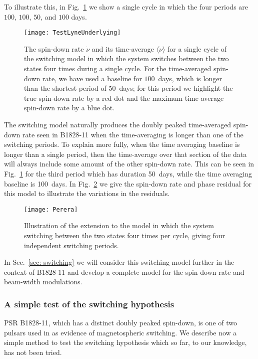 To illustrate this, in Fig.~\ref{fig: test lyne underlying} we show a single
cycle in which the four periods are $100$, $100$, $50$, and $100$ days.
\begin{figure}[htb]
    \centering
    \texttt{[image: TestLyneUnderlying]}
    \caption{The spin-down rate $\dot{\nu}$ and its time-average $\langle\dot{\nu}\rangle$
    for a single cycle of the \citet{Perera2014} switching model in which the
    system switches between the two states four times during a single cycle.
    For the time-averaged spin-down rate, we have used a baseline for $100$~days,
    which is longer than the shortest period of 50~days; for this period we
    highlight the true spin-down rate by a red dot and the maximum time-average
    spin-down rate by a blue dot.}
    \label{fig: test lyne underlying}
\end{figure}

The \citet{Perera2014} switching model naturally produces the doubly peaked
time-averaged spin-down rate seen in B1828-11 when the time-averaging is longer
than one of the switching periods. To explain more fully, when the time
averaging baseline is longer than a single period, then the time-average over
that section of the data will always include some amount of the other spin-down
rate. This can be seen in Fig.~\ref{fig: test lyne underlying} for the third
period which has duration 50~days, while the time averaging baseline is
100~days. In Fig.~\ref{fig: perera example} we give the spin-down rate and
phase residual for this model to illustrate the variations in the residuals.
\begin{figure}[htb]
    \centering
    \texttt{[image: Perera]}
    \caption{Illustration of the \citet{Perera2014} extension to the
    \citet{Lyne2010} model in which the system switching between the two states
    four times per cycle, giving four independent switching periods.}
    \label{fig: perera example}
\end{figure}

In Sec.~\ref{sec: switching} we will consider this switching
model further in the context of B1828-11 and develop a complete model for the
spin-down rate and beam-width modulations.

\subsubsection{A simple test of the switching hypothesis}
PSR B1828-11, which has a distinct doubly peaked spin-down, is one of two pulsars
used in \citet{Lyne2010} as evidence of magnetospheric switching. We describe now
a simple method to test the switching hypothesis which so far, to our knowledge,
has not been tried.

